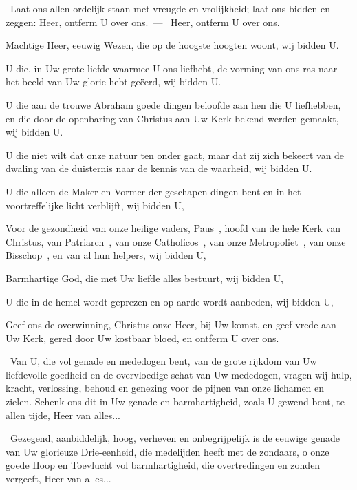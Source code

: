 \documentclass[12pt,twoside,a5paper]{article}
\begin{document}




\begin{halfparskip}
  \dd~Laat ons allen ordelijk staan met vreugde en vrolijkheid; laat ons bidden en zeggen: Heer, ontferm U over ons.~--- \rr~Heer, ontferm U over ons. 

  Machtige Heer, eeuwig Wezen, die op de hoogste hoogten woont, wij bidden U.

  U die, in Uw grote liefde waarmee U ons liefhebt, de vorming van ons ras naar het beeld van Uw glorie hebt geëerd, wij bidden U.

  U die aan de trouwe Abraham goede dingen beloofde aan hen die U liefhebben, en die door de openbaring van Christus aan Uw Kerk bekend werden gemaakt, wij bidden U.

  U die niet wilt dat onze natuur ten onder gaat, maar dat zij zich bekeert van de dwaling van de duisternis naar de kennis van de waarheid, wij bidden U.

  U die alleen de Maker en Vormer der geschapen dingen bent en in het voortreffelijke licht verblijft, wij bidden U,

  Voor de gezondheid van onze heilige vaders, Paus~\NN , hoofd van de hele Kerk van Christus, van Patriarch~\NN , van onze Catholicos~\NN , van onze Metropoliet~\NN , van onze Bisschop~\NN , en van al hun helpers, wij bidden U,

  Barmhartige God, die met Uw liefde alles bestuurt, wij bidden U,

  U die in de hemel wordt geprezen en op aarde wordt aanbeden, wij bidden U,

  Geef ons de overwinning, Christus onze Heer, bij Uw komst, en geef vrede aan Uw Kerk, gered door Uw kostbaar bloed, en ontferm U over ons.

  \cc~Van U, die vol genade en mededogen bent, van de grote rijkdom van Uw liefdevolle goedheid en de overvloedige schat van Uw mededogen, vragen wij hulp, kracht, verlossing, behoud en genezing voor de pijnen van onze lichamen en zielen. Schenk ons dit in Uw genade en barmhartigheid, zoals U gewend bent, te allen tijde, Heer van alles...

  \cc~Gezegend, aanbiddelijk, hoog, verheven en onbegrijpelijk is de eeuwige genade van Uw glorieuze Drie-eenheid, die medelijden heeft met de zondaars, o onze goede Hoop en Toevlucht vol barmhartigheid, die overtredingen en zonden vergeeft, Heer van alles...
\end{halfparskip}
\end{document}
